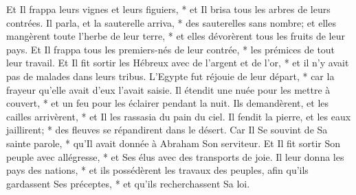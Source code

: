 Et Il frappa leurs vignes et leurs figuiers, * et Il brisa tous les arbres de leurs contrées.
Il parla, et la sauterelle arriva, * des sauterelles sans nombre;
et elles mangèrent toute l'herbe de leur terre, * et elles dévorèrent tous les fruits de leur pays.
Et Il frappa tous les premiers-nés de leur contrée, * les prémices de tout leur travail.
Et Il fit sortir les Hébreux avec de l'argent et de l'or, * et il n'y avait pas de malades dans leurs tribus.
L'Egypte fut réjouie de leur départ, * car la frayeur qu'elle avait d'eux l'avait saisie.
Il étendit une nuée pour les mettre à couvert, * et un feu pour les éclairer pendant la nuit.
Ils demandèrent, et les cailles arrivèrent, * et Il les rassasia du pain du ciel.
Il fendit la pierre, et les eaux jaillirent; * des fleuves se répandirent dans le désert.
Car Il Se souvint de Sa sainte parole, * qu'Il avait donnée à Abraham Son serviteur.
Et Il fit sortir Son peuple avec allégresse, * et Ses élus avec des transports de joie.
Il leur donna les pays des nations, * et ils possédèrent les travaux des peuples,
afin qu'ils gardassent Ses préceptes, * et qu'ils recherchassent Sa loi.

